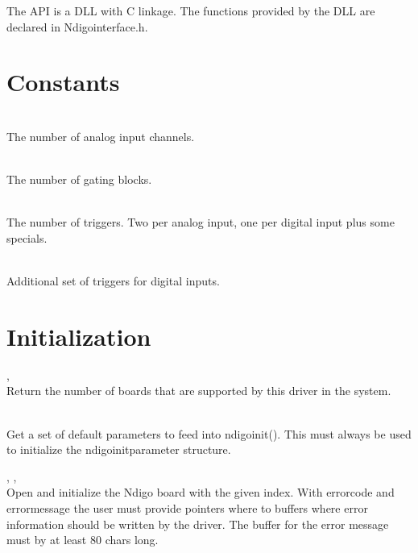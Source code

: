 The API is a DLL with C linkage. The functions provided by the DLL are declared in \textsf{Ndigo\tu interface.h}. \par

\section{Constants}

	\\
	The number of analog input channels.\par

	\\
	The number of gating blocks.\par

	\\
	The number of triggers. Two per analog input, one per digital input plus some specials.\par

	\\
	Additional set of triggers for digital inputs.

	\section{Initialization}

		, \\
		Return the number of boards that are supported by this driver in the system.\par

		\\
		Get a set of default parameters to feed into \textsf{ndigo\tu init()}. This must always be used to initialize the \textsf{ndigo\tu init\tu parameter structure}.\par

		, ,\newline {}\\
		Open and initialize the Ndigo board with the given index. With \textsf{error\tu code} and \textsf{error\tu message} the user must provide pointers where to buffers where error information should be written by the driver. The buffer for the error message must by at least 80 chars long.\par
		
